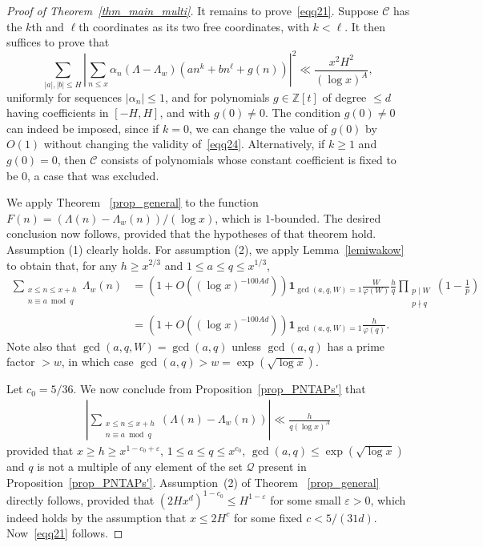 \documentclass[11pt,letterpaper]{amsart}
\renewcommand{\leq}{\leqslant}
\renewcommand{\geq}{\geqslant}
\theoremstyle{definition}
\numberwithin{equation}{section}
\DeclareMathOperator{\n}{N}
\newcommand{\0}{\mathbf{0}}
\begin{document}
\begin{proof}[Proof of Theorem~\ref{thm_main_multi}]
It remains to prove~\eqref{eqq21}.
Suppose  $\mathscr{C}$ has the $k$th and $\ell$th coordinates as its two free coordinates, with $k<\ell$. It then suffices to prove that 
\begin{equation}
\sum_{|a|,|b|\leq H}\left|\sum_{n\leq x}\alpha_n(\Lambda-\Lambda_w)(an^k+bn^{\ell}+g(n))\right|^2\ll \frac{x^2H^2}{(\log x)^{A}},\label{eqq24}
\end{equation}
uniformly for 
sequences $|\alpha_n|\leq 1$, and for 
polynomials $g\in \mathbb{Z}[t]$ of degree $\leq d$ having coefficients in $[-H,H]$, and with $g(0)\neq 0$. 
The condition $g(0)\neq 0$ can indeed be imposed, since if $k=0$, we can change the value of $g(0)$ by $O(1)$ without changing the validity of~\eqref{eqq24}. Alternatively, if $k\geq 1$ and $g(0)=0$, then $\mathscr{C}$ consists of polynomials whose constant coefficient is fixed to be $0$, a case that was excluded.

We apply Theorem ~\ref{prop_general} to the 
 function $F(n)=(\Lambda(n)-\Lambda_w(n))/(\log x)$, 
which is $1$-bounded.
The desired conclusion now follows, provided that the hypotheses of that theorem hold. Assumption (1) clearly holds. For assumption (2), we apply Lemma~\ref{lemiwakow} to obtain that, for any $h\geq x^{2/3}$ and $1\leq a\leq q\leq x^{1/3}$,
\begin{align*}
\sum_{\substack{x\leq n\leq x+h\\n\equiv a\bmod q}} \Lambda_w(n)&=(1+O((\log x)^{-100Ad}))\mathbf 1_{\gcd(a,q,W)=1}\frac{W}{\varphi(W)}\frac{h}{q}\prod_{\substack{p\mid W\\p\nmid q}}\left(1-\frac{1}{p}\right)\\
&=(1+O((\log x)^{-100Ad}))\mathbf 1_{\gcd(a,q,W)=1}\frac{h}{\varphi(q)}.
\end{align*}
 Note also that $\gcd(a,q,W)=\gcd(a,q)$ unless $\gcd(a,q)$ has a prime factor $>w$, in which case $\gcd(a,q)>w=\exp(\sqrt{\log x})$. 

Let $c_0=5/36$. 
We now conclude from  Proposition~\ref{prop_PNTAPs'} that
\begin{align*}
\left|\sum_{\substack{x\leq n\leq x+h\\n\equiv a\bmod q}}(\Lambda(n)-\Lambda_{w}(n))\right|\ll \frac{h}{q(\log x)^{A}}    
\end{align*}
provided that  $x\geq h\geq x^{1-c_0+\varepsilon}$, $1\leq a\leq q\leq x^{c_0}$,  $\gcd(a,q)\leq\exp(\sqrt{\log x})$ and $q$ is not a multiple of any element of the set $\mathcal{Q}$ present in Proposition~\ref{prop_PNTAPs'}. Assumption~(2) of Theorem 
~\ref{prop_general} directly follows, provided that $(2Hx^d)^{1-c_0}\leq H^{1-\varepsilon}$ for some small $\varepsilon>0$, which indeed holds by the assumption that $x\leq 2H^{c}$ for some fixed $c<5/(31d)$. Now~\eqref{eqq21} follows.
\end{proof}
\end{document}
